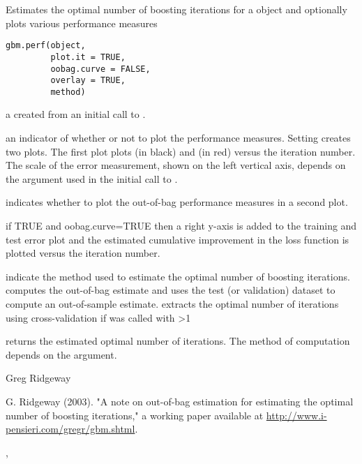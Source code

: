\begin{Description}\relax
Estimates the optimal number of boosting iterations for a  object and
optionally plots various performance measures
\end{Description}
\begin{Usage}
\begin{verbatim}
gbm.perf(object, 
         plot.it = TRUE, 
         oobag.curve = FALSE, 
         overlay = TRUE, 
         method)
\end{verbatim}
\end{Usage}
\begin{Arguments}
\begin{ldescription}
\item[\code{object}] a  created from an initial call to 
.
\item[\code{plot.it}] an indicator of whether or not to plot the performance measures.
Setting  creates two plots. The first plot plots 
 (in black) and  (in red) 
versus the iteration number. The scale of the error measurement, shown on the 
left vertical axis, depends on the  argument used in the 
initial call to .
\item[\code{oobag.curve}] indicates whether to plot the out-of-bag performance measures
in a second plot.
\item[\code{overlay}] if TRUE and oobag.curve=TRUE then a right y-axis is added to the 
training and test error plot and the estimated cumulative improvement in the loss 
function is plotted versus the iteration number.
\item[\code{method}] indicate the method used to estimate the optimal number
of boosting iterations.  computes the out-of-bag
estimate and  uses the test (or validation) dataset 
to compute an out-of-sample estimate.  extracts the 
optimal number of iterations using cross-validation if  was called
with >1
\end{ldescription}
\end{Arguments}
\begin{Value}
 returns the estimated optimal number of iterations. The method 
of computation depends on the  argument.
\end{Value}
\begin{Author}\relax
Greg Ridgeway 
\end{Author}
\begin{References}\relax
G. Ridgeway (2003). "A note on out-of-bag estimation for estimating the optimal
number of boosting iterations," a working paper available at
\url{http://www.i-pensieri.com/gregr/gbm.shtml}.
\end{References}
\begin{SeeAlso}\relax
{}, 
\end{SeeAlso}

